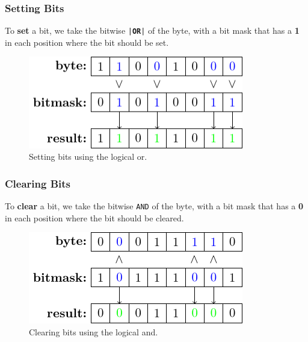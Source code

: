 \documentclass{article}
\newcommand{\keyword}[1]{\textcolor[rgb]{0.00,0.50,0.00}{\textbf{#1}}}
\begin{document}
\subsubsection{Setting Bits}
To \textbf{set} a bit, we take the bitwise \texttt{|\keyword{OR}|} of the byte, with a bit mask
that has a \textbf{1} in each position where the bit should be set.
\begin{figure}[H]
    \centering
    \includegraphics[height = 4cm, keepaspectratio = true]{figures/bit_set.pdf}
    \caption{Setting bits using the logical or.} %
\end{figure}
\subsubsection{Clearing Bits}
To \textbf{clear} a bit, we take the bitwise \texttt{AND} of the byte, with a bit mask
that has a \textbf{0} in each position where the bit should be cleared.
\begin{figure}[H]
    \centering
    \includegraphics[height = 4cm, keepaspectratio = true]{figures/bit_clear.pdf}
    \caption{Clearing bits using the logical and.} %
\end{figure}
\end{document}
